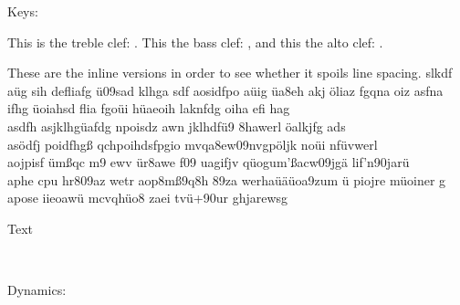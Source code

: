 \documentclass{scrartcl}
\begin{document}
	Keys:
	
	This is the treble clef: \clefG . This the bass clef: \clefF, and this the alto clef: \clefC.
	
	These are the inline versions in order to see whether it spoils line spacing. slkdf aüg sih defliafg ü09sad klhga sdf \clefGInline aosidfpo aüig üa8eh akj öliaz fgqna oiz asfna ifhg üoiahsd flia fgoüi hüaeoih laknfdg oiha efi hag \\
	asdfh asjklhgüafdg npoisdz awn jklhdfü9 8hawerl öalkjfg ads\\
	asödfj \clefFInline poidfhgß qchpoihdsfpgio mvqa8ew09nvgpöljk noüi nfüvwerl \\
	aojpisf ümßqc m9 ewv ür8awe f09 uagifjv qüogum'ßacw09jgä lif'n90jarü\\
	aphe cpu hr809az wetr \clefCInline aop8mß9q8h 89za werhaüäüoa9zum ü piojre müoiner g\\
	apose iieoawü mcvqhüo8 zaei tvü+90ur ghjarewsg 
	
	
	
	\clefF Text
	
	
	

	 ~

	 \lilyDot[scale=1.2]
	
	
	Dynamics: 
	


\end{document}
